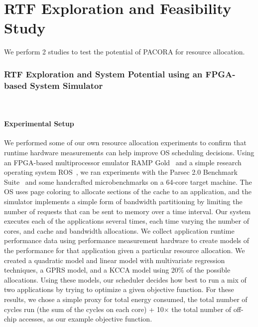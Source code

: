 \chapter{RTF Exploration and Feasibility Study}\label{init_eval}

We perform 2 studies to test the potential of PACORA for resource allocation.

\subsection{RTF Exploration and System Potential using an FPGA-based System Simulator}
~\cite{bird,tess_resource}



\subsubsection*{Experimental Setup}

We performed some of our own resource allocation experiments to
confirm that runtime hardware measurements can help improve OS
scheduling decisions.  Using an FPGA-based multiprocessor emulator RAMP Gold~\cite{rampgold09, rampgold10, fame10} and
a simple research operating system ROS~\cite{ros, tess,tess_resource}, we ran experiments with the Parsec
2.0 Benchmark Suite~\cite{parsec} and some handcrafted
microbenchmarks on a 64-core target machine. The OS uses page coloring
to allocate sections of the cache to an application, and the simulator
implements a simple form of bandwidth partitioning by limiting the
number of requests that can be sent to memory over a time
interval. Our system executes each of the applications several times,
each time varying the number of cores, and cache and bandwidth
allocations.  We collect application runtime performance data using
performance measurement hardware to create models of the performance
for that application given a particular resource allocation.  We
created a quadratic model and linear model with multivariate
regression techniques, a GPRS model, and a KCCA model using 20\% of the possible allocations.  Using
these models, our scheduler decides how best to run a mix of two
applications by trying to optimize a given objective function.  For
these results, we chose a simple proxy for total energy consumed, the
total number of cycles run (the sum of the cycles on each core) +
10$\times$ the total number of off-chip accesses, as our example
objective function.

